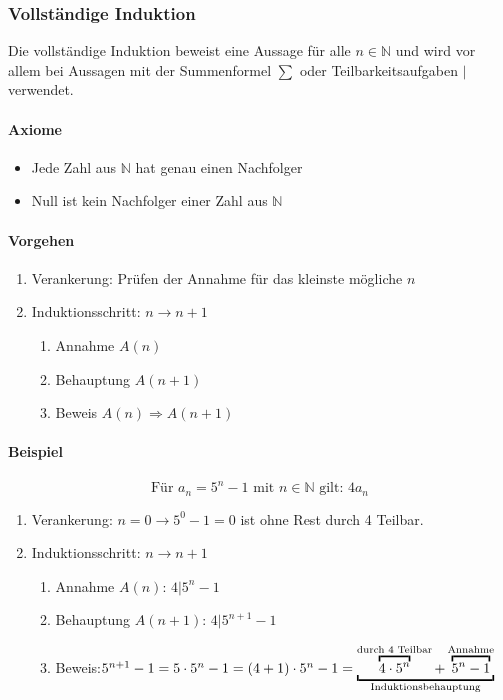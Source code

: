 \begin{multicols}{2}
\subsubsection{Vollständige Induktion}
	Die vollständige Induktion beweist eine Aussage für alle $n \in \mathbb{N}$ und wird vor allem bei Aussagen mit der Summenformel $\sum$ oder Teilbarkeitsaufgaben $|$ verwendet.

	\paragraph{Axiome}
	\begin{itemize}
		\item Jede Zahl aus $\mathbb{N}$ hat genau einen Nachfolger
		\item Null ist kein Nachfolger einer Zahl aus $\mathbb{N}$
	\end{itemize}

	\paragraph{Vorgehen}
	\begin{enumerate}
		\item Verankerung: Prüfen der Annahme für das kleinste mögliche $n$
		\item Induktionsschritt: $n \to n+1$
		\begin{enumerate}
			\item Annahme $A(n)$
			\item Behauptung $A(n+1)$
			\item Beweis $A(n) \Rightarrow A(n+1)$
		\end{enumerate}
	\end{enumerate}
	
	\paragraph{Beispiel}
	\[
		\text{Für } a_n = 5^n -1 \text{ mit } n \in \mathbb{N} \text{ gilt: } 4a_n
	\]
	
	\begin{enumerate}
		\item Verankerung: $n=0 \rightarrow 5^0 -1 = 0$ ist ohne Rest durch 4 Teilbar.
		\item Induktionsschritt: $n \to n+1$
		\begin{enumerate}
			\item Annahme $A(n)$: $4|5^n -1$
			\item Behauptung $A(n+1)$: $4|5^{n+1} - 1$
			\item Beweis:\newline $
				5^{n+1} -1 = 5 \cdot 5^n -1 =\newline (4 + 1) \cdot 5^n -1 = \underbracket{
					\overbracket{
						4 \cdot 5^n
					}^{\text{durch 4 Teilbar}} + \overbracket{
						5^n -1
					}^{\text{Annahme}}
				}_{\text{Induktionsbehauptung}}
			$
		\end{enumerate}
	\end{enumerate}
	

\end{multicols}
